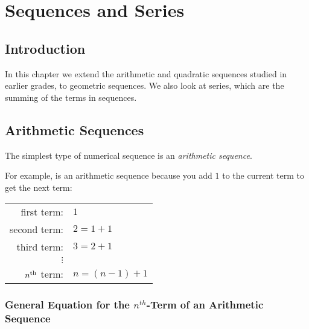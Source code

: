 \chapter{Sequences and Series}
\label{mp:s}

\section{Introduction}
In this chapter we extend the arithmetic and quadratic sequences studied in earlier grades, to geometric sequences. We also look at series, which are the summing of the terms in sequences.

\section{Arithmetic Sequences}
The simplest type of numerical sequence is an \textit{arithmetic sequence}. 


For example,
is an arithmetic sequence because you add $1$ to the current term to get the next term:
\begin{center}
\begin{tabular}{rl}
first term:&$1$\\
second term:&$2=1+1$\\
third term:&$3=2+1$\\
$\vdots$&\\
$n^{\rm{th}}$ term:&$n=(n-1)+1$\\
\end{tabular}
\end{center}


\subsection{General Equation for the $n^{th}$-Term of an Arithmetic Sequence}

